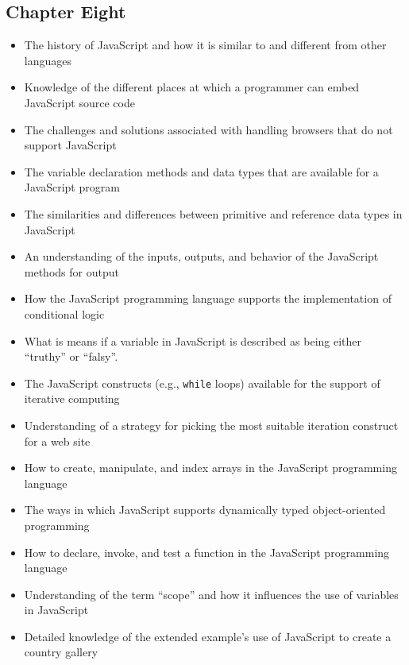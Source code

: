 \documentclass[11pt]{article}
\begin{document}
\vspace*{-.2in}
\subsection*{Chapter Eight}

\begin{itemize}


  \item The history of JavaScript and how it is similar to and different from
    other languages

  \item Knowledge of the different places at which a programmer can embed
    JavaScript source code

  \item The challenges and solutions associated with handling browsers that do
    not support JavaScript

  \item The variable declaration methods and data types that are available for a
    JavaScript program

  \item The similarities and differences between primitive and reference data
    types in JavaScript

  \item An understanding of the inputs, outputs, and behavior of the JavaScript
    methods for output

  \item How the JavaScript programming language supports the implementation of
    conditional logic

  \item What is means if a variable in JavaScript is described as being either
    ``truthy'' or ``falsy''.

  \item The JavaScript constructs (e.g., {\tt while} loops) available for the
    support of iterative computing

  \item Understanding of a strategy for picking the most suitable iteration
    construct for a web site

  \item How to create, manipulate, and index arrays in the JavaScript
    programming language

  \item The ways in which JavaScript supports dynamically typed object-oriented programming

  \item How to declare, invoke, and test a function in the JavaScript
    programming language

  \item Understanding of the term ``scope'' and how it influences the use of
    variables in JavaScript

  \item Detailed knowledge of the extended example's use of JavaScript to create
    a country gallery

\end{itemize}
\end{document}
